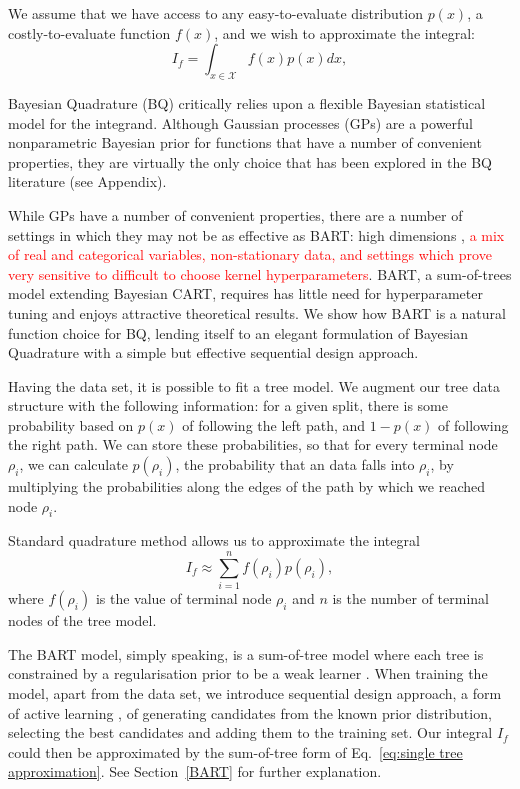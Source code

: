 We assume that we have access to any easy-to-evaluate distribution $p(x)$, a costly-to-evaluate function $f(x)$,
and we wish to approximate the integral:
\begin{equation}
	I_f = \int_{x \in \mathcal{X}} f(x) p(x) dx,
\label{eq:integral}
\end{equation}

Bayesian Quadrature (BQ) critically relies upon a flexible Bayesian statistical model for the integrand. Although Gaussian processes (GPs) are a powerful nonparametric Bayesian prior for functions that have a number of convenient properties, they are virtually the only choice that has been explored in the BQ literature (see Appendix). 

While GPs have a number of convenient properties, there are a number of settings in which they may not be as effective as BART: high dimensions \cite{7352306}, \textcolor{red}{a mix of real and categorical variables, non-stationary data, and settings which prove very sensitive to difficult to choose kernel hyperparameters}. BART, a sum-of-trees model extending Bayesian CART, requires has little need for hyperparameter tuning and enjoys attractive theoretical results. We show how BART is a natural function choice for BQ, lending itself to an elegant formulation of Bayesian Quadrature with a simple but effective sequential design approach. 


Having the data set, it is possible to fit a tree model. We augment our tree data structure with the following information: for a given split, there is some probability based on $p(x)$ of following the left path, and $1-p(x)$ of following the right path. We can store these probabilities, so that for every terminal node $\rho_i$, we can calculate $p(\rho_i)$, the probability that an data falls into $\rho_i$, by multiplying the probabilities along the edges of the path by which we reached node $\rho_i$.

Standard quadrature method \cite{BQ} allows us to approximate the integral
\begin{equation}
	I_f \approx \sum_{i=1}^{n} f(\rho_i)p(\rho_i),
\label{eq:single tree approximation}
\end{equation}
where $f(\rho_i)$ is the value of terminal node $\rho_i$ and $n$ is the number of terminal nodes of the tree model.

The BART model, simply speaking, is a sum-of-tree model where each tree is constrained by a regularisation prior to be a weak learner \cite{BART}. When training the model, apart from the data set, we introduce sequential design approach, a form of active learning \cite{doi:10.1002/cjs.11156}, of generating candidates from the known prior distribution, selecting the best candidates and adding them to the training set. Our integral $I_f$ could then be approximated by the sum-of-tree form of Eq.~\eqref{eq:single tree approximation}. See Section~\ref{BART} for further explanation.